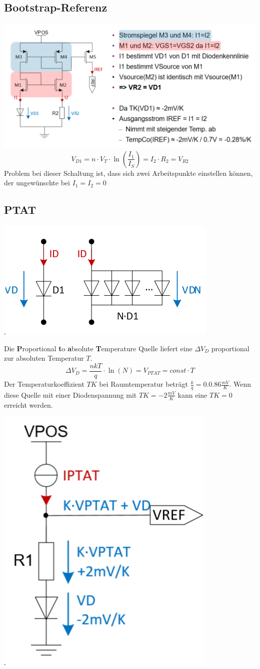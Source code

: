 \subsection{Bootstrap-Referenz}
\includegraphics[width=\columnwidth]{Images/bootstrap_ref}
\[
V_{D1} = n\cdot V_T \cdot \ln\left(\frac{I_1}{I_S}\right) = I_2 \cdot R_2 = V_{R2}
\]
Problem bei dieser Schaltung ist, dass sich zwei Arbeitspunkte einstellen können, der ungewünschte bei $I_1 = I_2 = 0$

\subsection{PTAT}
\begin{center}
	\includegraphics[width=0.5\columnwidth]{Images/pat}
\end{center}
Die \textbf{P}roportional \textbf{t}o \textbf{a}bsolute \textbf{T}emperature Quelle liefert eine $\Delta V_D$ proportional zur absoluten Temperatur $T$.
\[
\Delta V_D = \frac{nkT}{q}\cdot\ln(N) = V_{PTAT} = const \cdot T
\]
Der Temperaturkoeffizient $TK$ bei Raumtemperatur beträgt $\frac{k}{q} = 0.0.86\frac{mV}{K}$. Wenn diese Quelle mit einer Diodenspannung mit $TK = -2\frac{mV}{K}$ kann eine $TK = 0$ erreicht werden. 

\begin{center}
	\includegraphics[width=0.3\columnwidth]{Images/ptat}
\end{center}

